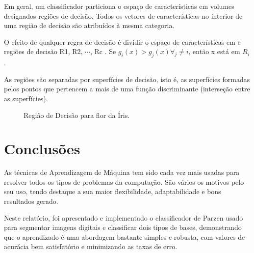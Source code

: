\documentclass[preprint,12pt]{elsarticle}
\begin{document}
Em geral, um classificador particiona o espaço de características em volumes designados regiões de decisão. Todos os vetores de características no interior de uma região de decisão são atribuídos à mesma categoria.

O efeito de qualquer regra de decisão é dividir o espaço de características em c regiões de decisão R1, R2, $\cdots$, Rc . Se $g_i (x) > g_j(x)  \forall_j \neq i$, então x está em $R_i$.

As regiões são separadas por superfícies de decisão, isto é, as superfícies formadas pelos pontos que pertencem a mais de uma função discriminante (interseção entre as superfícies).

\begin{figure}[H]
	\centering
	
	
	\caption{Região de Decisão para flor da Íris.}
	\label{fig:decisionRegionIris}
\end{figure}

\section{Conclusões}

As técnicas de Aprendizagem de Máquina tem sido cada vez mais usadas para resolver todos os tipos de problemas da computação. São vários os motivos pelo seu uso, tendo destaque a sua maior flexibilidade, adaptabilidade e bons resultados gerado.

Neste relatório, foi apresentado e implementado o classificador de Parzen usado para segmentar imagens digitais e classificar dois tipos de bases, demonstrando que o aprendizado é uma abordagem bastante simples e robusta, com valores de acurácia bem satisfatório e minimizando as taxas de erro. 


\end{document}
